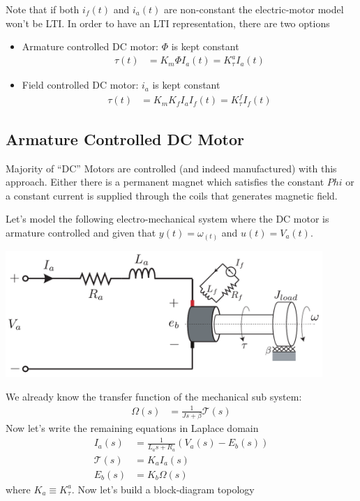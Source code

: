 \documentclass[twoside]{article}
\begin{document}
\vspace{12pt}
%
Note that if both $i_f(t)$ and $i_a(t)$ are non-constant the electric-motor model 
won't be LTI. In order to have an LTI representation, there are two options
%
\begin{itemize}
	\item Armature controlled DC motor: $\Phi$ is kept constant 
	\begin{align*}
		\tau(t) &= K_m \Phi I_a(t) = K_{\tau}^a I_a(t)
	\end{align*}
	\item Field controlled DC motor: $i_a$ is kept constant 
	\begin{align*}
		\tau(t) &= K_m K_f I_a I_f(t) = K_{\tau}^f I_f(t)
	\end{align*}
\end{itemize}

\subsection{Armature Controlled DC Motor}

Majority of ``DC'' Motors are controlled (and indeed manufactured) with this approach. Either
there is a permanent magnet which satisfies the constant $Phi$ or a constant current is supplied
through the coils that generates magnetic field.

Let's model the following electro-mechanical system where the DC motor is armature controlled 
and given that $y(t) = \omega_(t)$ and $u(t) = V_a(t)$.

  \begin{minipage}[h]{1\linewidth}
    \begin{center}
      \includegraphics[width=0.9\textwidth]{Armature_DC_Motor}
    \end{center}
  \end{minipage} 
 
 We already know the transfer function of the mechanical sub system:
\begin{align*}
	\Omega(s) &= \frac{1}{J s + \beta} \mathcal{T}(s)
\end{align*}
 Now let's write the remaining equations in Laplace domain
 \begin{align*}
	I_a(s) &= \frac{1}{L_a s + R_a} \left( V_a(s) - E_b(s) \right)
	\\
	\mathcal{T}(s) &= K_a I_a(s)
	\\
	E_b(s) &= K_b \Omega(s)
\end{align*}
%
where $K_a \equiv K_{\tau}^a$. Now let's build a block-diagram topology
\end{document}
